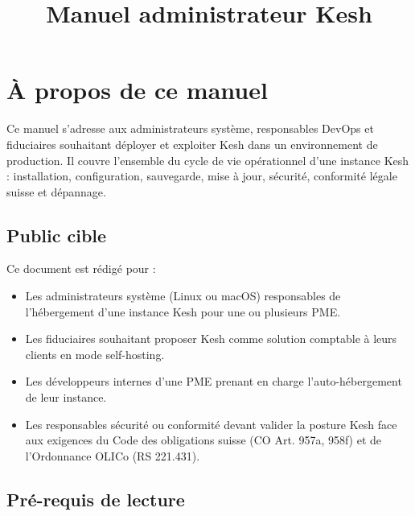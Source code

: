 \documentclass[a4paper,11pt,oneside]{article}
\title{Manuel administrateur Kesh}
\author{\keshAuthor}
\date{\keshReleaseDate}
\begin{document}



\tableofcontents
\clearpage

\section{À propos de ce manuel}

Ce manuel s'adresse aux administrateurs système, responsables DevOps et fiduciaires souhaitant déployer et exploiter Kesh dans un environnement de production. Il couvre l'ensemble du cycle de vie opérationnel d'une instance Kesh : installation, configuration, sauvegarde, mise à jour, sécurité, conformité légale suisse et dépannage.

\subsection{Public cible}

Ce document est rédigé pour :

\begin{itemize}
    \item Les administrateurs système (Linux ou macOS) responsables de l'hébergement d'une instance Kesh pour une ou plusieurs PME.
    \item Les fiduciaires souhaitant proposer Kesh comme solution comptable à leurs clients en mode self-hosting.
    \item Les développeurs internes d'une PME prenant en charge l'auto-hébergement de leur instance.
    \item Les responsables sécurité ou conformité devant valider la posture Kesh face aux exigences du Code des obligations suisse (CO Art. 957a, 958f) et de l'Ordonnance OLICo (RS 221.431).
\end{itemize}

\subsection{Pré-requis de lecture}
\end{document}
